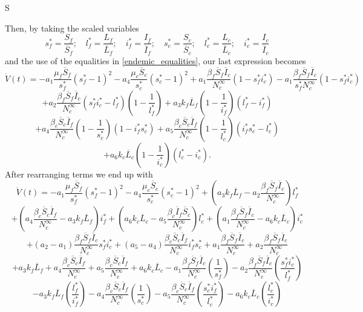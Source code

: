 S\documentclass[preprint,12pt]{elsarticle}
\begin{document}
\noindent Then, by taking the scaled variables
$$
s_f^*=\frac{S_f}{\overline{S}_f};\quad l_f^*=\frac{L_f}{\overline{L}_f};\quad i_f^*=\frac{I_f}{\overline{I}_f};\quad
s_c^*=\frac{S_c}{\overline{S}_c};\quad l_c^*=\frac{L_c}{\overline{L}_c};\quad i_c^*=\frac{I_c}{\overline{I}_c}
$$
and the use of the equalities in \ref{endemic_equalities}, our last expression becomes
$$\dot{V}(t)=-a_1\frac{\mu_f\overline{S}_f}{s_f^*}\left(s_f^*-1\right)^2-a_4\frac{\mu_c\overline{S}_c}{s_c^*}\left(s_c^*-1\right)^2+a_1\frac{\beta_f\overline{S}_f\overline{I}_c}{N_c^{\infty}}(1-s_f^*i_c^*)-a_1\frac{\beta_f\overline{S}_f\overline{I}_c}{s_f^*N_c^{\infty}}(1-s_f^*i_c^*)$$
$$+a_2\frac{\beta_f\overline{S}_f\overline{I}_c}{N_c^{\infty}}\left(s_f^*i_c^*-l_f^*\right)\left(1-\frac{1}{l_f^*}\right)+a_3k_f\overline{L}_f\left(1-\frac{1}{i_f^*}\right)\left(l_f^*-i_f^*\right)$$
$$+a_4\frac{\beta_c\overline{S}_c\overline{I}_f}{N_c^{\infty}}\left(1-\frac{1}{s_c^*}\right)\left(1-i_f^*s_c^*\right)+a_5\frac{\beta_c\overline{S}_c\overline{I}_f}{N_c^{\infty}}\left(1-\frac{1}{l_c^*}\right)\left(i_f^*s_c^*-l_c^*\right)$$
$$+a_6k_c\overline{L}_c\left(1-\frac{1}{i_c^*}\right)\left(l_c^*-i_c^*\right).$$
After rearranging terms we end up with
$$\dot{V}(t)=-a_1\frac{\mu_f\overline{S}_f}{s_f^*}\left(s_f^*-1\right)^2-a_4\frac{\mu_c\overline{S}_c}{s_c^*}\left(s_c^*-1\right)^2+\left(a_3k_f\overline{L}_f-a_2\frac{\beta_f\overline{S}_f\overline{I}_c}{N_c^{\infty}}\right)l_f^*$$ 
$$+\left(a_4\frac{\beta_c\overline{S}_c\overline{I}_f}{N_c^{\infty}}-a_3k_f\overline{L}_f\right)i_f^*+\left(a_6k_c\overline{L}_c-a_5\frac{\beta_c\overline{I}_f\overline{S}_c}{N_c^{\infty}}\right)l_c^*+\left(a_1\frac{\beta_f\overline{S}_f\overline{I}_c}{N_c^{\infty}}-a_6k_c\overline{L}_c\right)i_c^*$$
$$+\left(a_2-a_1\right)\frac{\beta_f\overline{S}_f\overline{I}_c}{N_c^{\infty}}s_f^*i_c^*+\left(a_5-a_4\right)\frac{\beta_c\overline{S}_c\overline{I}_f}{N_c^{\infty}}i_f^*s_c^*+a_1\frac{\beta_f\overline{S}_f\overline{I}_c}{N_c^{\infty}}+a_2\frac{\beta_f\overline{S}_f\overline{I}_c}{N_c^{\infty}}$$
$$+a_3k_f\overline{L}_f+a_4\frac{\beta_c\overline{S}_c\overline{I}_f}{N_c^{\infty}}+a_5\frac{\beta_c\overline{S}_c\overline{I}_f}{N_c^{\infty}}+a_6k_c\overline{L}_c-a_1\frac{\beta_f\overline{S}_f\overline{I}_c}{N_c^{\infty}}\left(\frac{1}{s_f^*}\right)-a_2\frac{\beta_f\overline{S}_f\overline{I}_c}{N_c^{\infty}}\left(\frac{s_f^*i_c^*}{l_f^*}\right)$$
$$-a_3k_f\overline{L}_f\left(\frac{l_f^*}{i_f^*}\right)-a_4\frac{\beta_c\overline{S}_c\overline{I}_f}{N_c^{\infty}}\left(\frac{1}{s_c^*}\right)-a_5\frac{\beta_c\overline{S}_c\overline{I}_f}{N_c^{\infty}}\left(\frac{s_c^*i_f^*}{l_c^*}\right)-a_6k_c\overline{L}_c\left(\frac{l_c^*}{i_c^*}\right) $$
\end{document}
